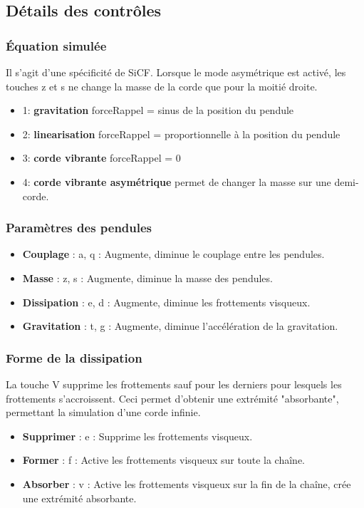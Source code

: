 \subsection{Détails des contrôles}
%
%
\subsubsection{Équation simulée}
%
Il s'agit d'une spécificité de SiCF. Lorsque le mode asymétrique est activé, les touches {\sf z} et {\sf s} ne change la masse de la corde que pour la moitié droite. 
%
\begin{itemize}[leftmargin=2cm, label=, itemsep=0pt]%
\item 1: {\bf gravitation} forceRappel = sinus de la position du pendule
\item 2: {\bf linearisation} forceRappel = proportionnelle à la position du pendule
\item 3: {\bf corde vibrante} forceRappel = 0
\item 4: {\bf corde vibrante asymétrique} permet de changer la masse sur une demi-corde.
\end{itemize}
%
\subsubsection{Paramètres des pendules}
%
\begin{itemize}[label=, leftmargin=2cm, itemsep=0pt]
\item {\bf Couplage} : {\sf a}, {\sf q} : Augmente, diminue le couplage entre les pendules.
\item {\bf Masse} : {\sf z}, {\sf s} :  Augmente, diminue la masse des pendules.
\item {\bf Dissipation} : {\sf e}, {\sf d} :  Augmente, diminue les frottements visqueux.
\item {\bf Gravitation} : {\sf t}, {\sf g} :  Augmente, diminue l'accélération de la gravitation.
\end{itemize}
%
%
\subsubsection{Forme de la dissipation}
%
La touche {\sf V} supprime les frottements sauf pour les derniers pour lesquels les frottements s'accroissent. Ceci permet d'obtenir une extrémité "absorbante", permettant la simulation d'une corde infinie.
%
\begin{itemize}[label=, leftmargin=2cm, itemsep=0pt]
\item {\bf Supprimer} : {\sf e} : Supprime les frottements visqueux.
\item {\bf Former} : {\sf f} : Active les frottements visqueux sur toute la chaîne.
\item {\bf Absorber} : {\sf v} : Active les frottements visqueux sur la fin de la chaîne, crée une extrémité absorbante.
\end{itemize}
%
%
